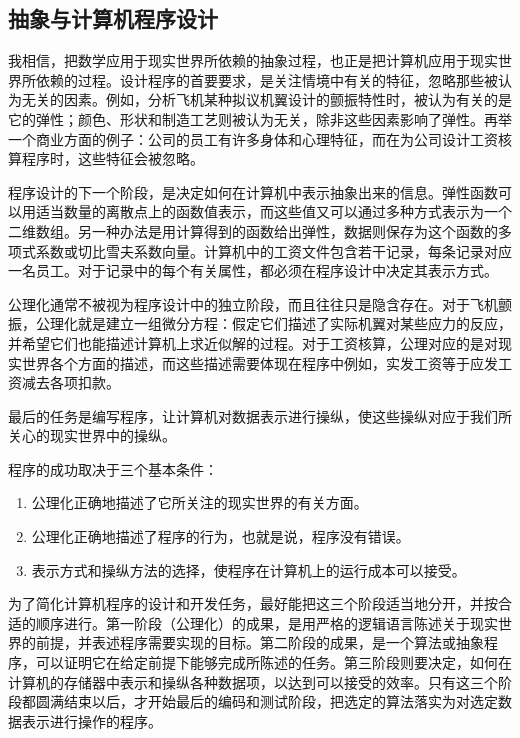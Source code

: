 \documentclass[twoside,11pt,fontset=none]{ctexbook}
\begin{document}
\subsection{抽象与计算机程序设计}

我相信，把数学应用于现实世界所依赖的抽象过程，也正是把计算机应用于现实世界所依赖的过程。设计程序的首要要求，是关注情境中有关的特征，忽略那些被认为无关的因素。例如，分析飞机某种拟议机翼设计的颤振特性时，被认为有关的是它的弹性；颜色、形状和制造工艺则被认为无关，除非这些因素影响了弹性。再举一个商业方面的例子：公司的员工有许多身体和心理特征，而在为公司设计工资核算程序时，这些特征会被忽略。

程序设计的下一个阶段，是决定如何在计算机中表示抽象出来的信息。弹性函数可以用适当数量的离散点上的函数值表示，而这些值又可以通过多种方式表示为一个二维数组。另一种办法是用计算得到的函数给出弹性，数据则保存为这个函数的多项式系数或切比雪夫系数向量。计算机中的工资文件包含若干记录，每条记录对应一名员工。对于记录中的每个有关属性，都必须在程序设计中决定其表示方式。

公理化通常不被视为程序设计中的独立阶段，而且往往只是隐含存在。对于飞机颤振，公理化就是建立一组微分方程：假定它们描述了实际机翼对某些应力的反应，并希望它们也能描述计算机上求近似解的过程。对于工资核算，公理对应的是对现实世界各个方面的描述，而这些描述需要体现在程序中\textemdash{}例如，实发工资等于应发工资减去各项扣款。

最后的任务是编写程序，让计算机对数据表示进行操纵，使这些操纵对应于我们所关心的现实世界中的操纵。

程序的成功取决于三个基本条件：

\begin{enumerate}[wide, nosep, label=(\arabic*)]
	\item 公理化正确地描述了它所关注的现实世界的有关方面。
	\item 公理化正确地描述了程序的行为，也就是说，程序没有错误。
	\item 表示方式和操纵方法的选择，使程序在计算机上的运行成本可以接受。
\end{enumerate}

为了简化计算机程序的设计和开发任务，最好能把这三个阶段适当地分开，并按合适的顺序进行。第一阶段（公理化）的成果，是用严格的逻辑语言陈述关于现实世界的前提，并表述程序需要实现的目标。第二阶段的成果，是一个算法或抽象程序，可以证明它在给定前提下能够完成所陈述的任务。第三阶段则要决定，如何在计算机的存储器中表示和操纵各种数据项，以达到可以接受的效率。只有这三个阶段都圆满结束以后，才开始最后的编码和测试阶段，把选定的算法落实为对选定数据表示进行操作的程序。
\end{document}
